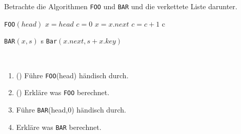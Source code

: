\documentclass{uebung_cs}
\begin{document}
\begin{aufgabe}
	Betrachte die Algorithmen \texttt{FOO} und \texttt{BAR} und die verkettete Liste darunter.
	\begin{center}
	\begin{minipage}{0.45\textwidth}
		\begin{algorithmic}
			\STATE \texttt{FOO}$(head)$
			\STATE $x = head$
			\STATE $c = 0$
				\STATE $x = x.next$
				\STATE $c = c + 1$
			\ENDWHILE
			\RETURN c
		\end{algorithmic}
	\end{minipage}%
		\hfill
	\begin{minipage}{0.45\textwidth}
		\begin{algorithmic}
			\STATE \texttt{BAR}$(x,s)$
			\IF{$x == null$}
				\RETURN s
			\ELSE
				\RETURN \texttt{Bar}$(x.next, s + x.key)$
			\ENDIF
		\end{algorithmic}
	\end{minipage}\\%
	\end{center}
	
	\begin{center}
	\end{center}

	\begin{enumerate}
		\item (\warmup) Führe \texttt{FOO}(head) händisch durch.
		\item (\warmup) Erkläre was \texttt{FOO} berechnet.
		\item Führe \texttt{BAR}(head,0) händisch durch.
		\item Erkläre was \texttt{BAR} berechnet.
	\end{enumerate}
\end{aufgabe}
\end{document}
